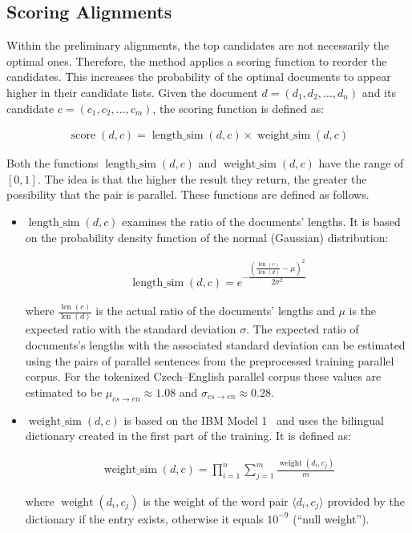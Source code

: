 \subsection{Scoring Alignments}
\label{subsection:scoring_alignments}

Within the preliminary alignments, the top candidates are not necessarily the optimal ones. Therefore, the method applies a scoring function to reorder the candidates. This increases the probability of the optimal documents to appear higher in their candidate lists. Given the document $d=(d_1, d_2, \ldots,d_n)$ and its candidate $c=(c_1, c_2, \ldots, c_m)$, the scoring function is defined as:
	
\begin{align*}
\operatorname{score}(d, c)=\operatorname{length\_sim}(d, c) \times \operatorname{weight\_sim}(d, c)
\end{align*}
	
Both the functions $\operatorname{length\_sim}(d, c)$ and $\operatorname{weight\_sim}(d, c)$ have the range of $[0, 1]$. The idea is that the higher the result they return, the greater the possibility that the pair is parallel. These functions are defined as follows.

\begin{itemize}
	\item $\operatorname{length\_sim}(d, c)$ examines the ratio of the documents' lengths. It is based on the probability density function of the normal (Gaussian) distribution:
	
	\begin{align*}
	\operatorname{length\_sim}(d, c)=e^{-\dfrac{(\frac{\operatorname{len}(c)}{\operatorname{len}(d)}-\mu)^2}{2\sigma^2}}
	\end{align*}
	
	where $\frac{\operatorname{len}(c)}{\operatorname{len}(d)}$ is the actual ratio of the documents' lengths and $\mu$ is the expected ratio with the standard deviation $\sigma$. The expected ratio of documents's lengths with the associated standard deviation can be estimated using the pairs of parallel sentences from the preprocessed training parallel corpus. For the tokenized Czech--English parallel corpus these values are estimated to be $\mu_{cs \rightarrow en} \approx 1.08$ and $\sigma_{cs \rightarrow en} \approx 0.28$.
	
	\item $\operatorname{weight\_sim}(d, c)$ is based on the IBM Model 1~\cite{Brown93} and uses the bilingual dictionary created in the first part of the training. It is defined as:
	
	\begin{align*}
	\operatorname{weight\_sim}(d, c)=\prod\limits_{i=1}^{n} \sum\limits_{j=1}^{m} \frac{\operatorname{weight}(d_i, c_j)}{m}
	\end{align*}
	
	where $\operatorname{weight}(d_i, c_j)$ is the weight of the word pair $\langle d_i,c_j \rangle$ provided by the dictionary if the entry exists, otherwise it equals $10^{-9}$ (``null weight'').
\end{itemize}

